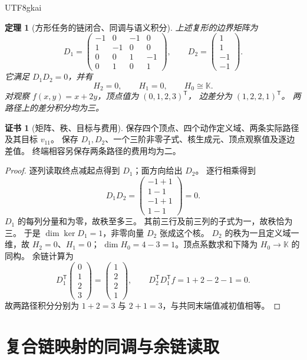 \documentclass[12pt,a4paper,openany,notitlepage]{report}
\theoremstyle{plain}
\newtheorem{theorem}{定理}[chapter]
\theoremstyle{definition}
\newtheorem*{certificate}{证书}
\theoremstyle{remark}
\begin{document}
\begin{CJK*}{UTF8}{gkai}
\begin{theorem}[方形任务的链闭合、同调与语义积分]
\label{exp:task:square-homology}
上述复形的边界矩阵为
\[
 D_1=\begin{pmatrix}
 -1&0&-1&0\\1&-1&0&0\\0&0&1&-1\\0&1&0&1
 \end{pmatrix},\qquad
 D_2=\begin{pmatrix}1\\1\\-1\\-1\end{pmatrix}.
\]
它满足 $D_1D_2=0$，并有
\[
 H_2=0,\qquad H_1=0,\qquad H_0\cong\mathbb K.
\]
对观察 $f(x,y)=x+2y$，顶点值为 $(0,1,2,3)^{\mathsf T}$，
边差分为 $(1,2,2,1)^{\mathsf T}$。
两路径上的差分积分均为三。
\end{theorem}
\begin{certificate}[矩阵、秩、目标与费用]
保存四个顶点、四个动作定义域、两条实际路径及其目标 $v_{11}$。
保存 $D_1,D_2$、一个三阶非零子式、核生成元、顶点观察值及逐边差值。
终端相容另保存两条路径的费用均为二。
\end{certificate}
\begin{proof}
逐列读取终点减起点得到 $D_1$；面方向给出 $D_2$。
逐行相乘得到
\[
 D_1D_2=\begin{pmatrix}-1+1\\1-1\\-1+1\\1-1\end{pmatrix}=0.
\]
$D_1$ 的每列分量和为零，故秩至多三。
其前三行及前三列的子式为一，故秩恰为三。
于是 $\dim\ker D_1=1$，非零向量 $D_2$ 张成这个核。
$D_2$ 的秩为一且定义域一维，故 $H_2=0$、$H_1=0$；
$\dim H_0=4-3=1$。顶点系数求和下降为 $H_0\to\mathbb K$ 的同构。
余链计算为
\[
 D_1^{\mathsf T}\begin{pmatrix}0\\1\\2\\3\end{pmatrix}
 =\begin{pmatrix}1\\2\\2\\1\end{pmatrix},\qquad
 D_2^{\mathsf T}D_1^{\mathsf T}f=1+2-2-1=0.
\]
故两路径积分分别为 $1+2=3$ 与 $2+1=3$，与共同末端值减初值相等。
\end{proof}

\section{复合链映射的同调与余链读取}


\end{CJK*}
\end{document}

